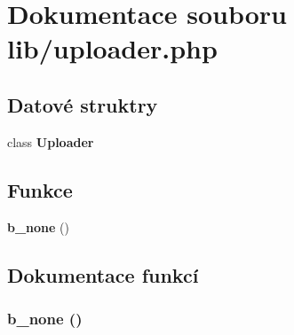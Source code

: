 \section{Dokumentace souboru lib/uploader.php}
\label{d4/d55/uploader_8php}
\subsection*{Datové struktry}
\begin{DoxyCompactItemize}
\item 
class {\bf Uploader}
\end{DoxyCompactItemize}
\subsection*{Funkce}
\begin{DoxyCompactItemize}
\item 
{\bf b\_\-none} ()
\end{DoxyCompactItemize}


\subsection{Dokumentace funkcí}
\subsubsection[{b\_\-none}]{\setlength{\rightskip}{0pt plus 5cm}b\_\-none ()}\label{d4/d55/uploader_8php_a0981f3f1d9fd38a791c3b6159d668f44}
